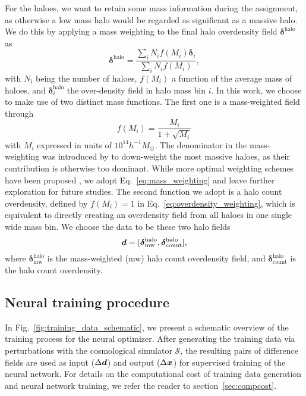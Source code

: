 For the haloes, we want to retain some mass information during the assignment, as otherwise a low mass halo would be regarded as significant as a massive halo. We do this by applying a mass weighting to the final halo overdensity field $\boldsymbol \delta^{\mathrm{halo}}$ as
\begin{equation}
    \boldsymbol \delta^{\mathrm{halo}} = \frac{\sum_iN_if(M_i)\boldsymbol \delta_i}{\sum_i N_if(M_i)},
    \label{eq:overdensity_weighting}
\end{equation}
with $N_i$ being the number of haloes, $f(M_i)$ a function of the average mass of haloes, and $\boldsymbol \delta^{\mathrm{halo}}_i$ the over-density field in halo mass bin $i$. In this work, we choose to make use of two distinct mass functions. The first one is a mass-weighted field through
\begin{equation}
    f(M_i) = \frac{M_i}{1+\sqrt{M_i}}
    \label{eq:mass_weighting}
\end{equation}
with $M_i$ expressed in units of $10^{14}h^{-1}M_{\odot}$. The denominator in the mass-weighting was introduced by \citet{Seljak2009} to down-weight the most massive haloes, as their contribution is otherwise too dominant. While more optimal weighting schemes have been proposed \citep{Hamaus2010, Liu2021}, we adopt Eq.~\eqref{eq:mass_weighting} and leave further exploration for future studies. The second function we adopt is a halo count overdensity, defined by $f(M_i) = 1$ in Eq.~\eqref{eq:overdensity_weighting}, which is equivalent to directly creating an overdensity field from all haloes in one single wide mass bin. We choose the data to be these two halo fields
\begin{equation}
    \boldsymbol{d} = [\boldsymbol{\delta}^{\mathrm{halo}}_{\mathrm{mw}}, \boldsymbol{\delta}^{\mathrm{halo}}_{\mathrm{count}}],
\end{equation}
where $\boldsymbol{\delta}^{\mathrm{halo}}_{\mathrm{mw}}$ is the mass-weighted (mw) halo count overdensity field, and $\boldsymbol{\delta}^{\mathrm{halo}}_{\mathrm{count}}$ is the halo count overdensity.

\subsection{Neural training procedure}
\label{sec:neural_training}

In Fig.~\ref{fig:training_data_schematic}, we present a schematic overview of the training process for the neural optimizer. After generating the training data via perturbations with the cosmological simulator $\mathscr{S}$, the resulting pairs of difference fields are used as input (${\Delta \boldsymbol{d}}$) and output ($\Delta \boldsymbol{x}$) for supervised training of the neural network. For details on the computational cost of training data generation and neural network training, we refer the reader to section~\ref{sec:compcost}.

